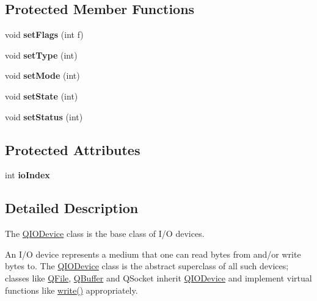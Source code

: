 \subsection*{Protected Member Functions}
\begin{DoxyCompactItemize}
\item 
\mbox{\label{class_q_i_o_device_a9ce695e889efa9145e47195fcc765bf5}} 
void {\bfseries set\+Flags} (int f)
\item 
\mbox{\label{class_q_i_o_device_a16f5a19e0d5dde3ba5e9672974d44b1a}} 
void {\bfseries set\+Type} (int)
\item 
\mbox{\label{class_q_i_o_device_a9a8d9bf655a71b5821699a97a78be6be}} 
void {\bfseries set\+Mode} (int)
\item 
\mbox{\label{class_q_i_o_device_ab8a455c1e81b3382c5db9a65ea70e615}} 
void {\bfseries set\+State} (int)
\item 
\mbox{\label{class_q_i_o_device_a742d895b19b6809d67aa1643baf67639}} 
void {\bfseries set\+Status} (int)
\end{DoxyCompactItemize}
\subsection*{Protected Attributes}
\begin{DoxyCompactItemize}
\item 
\mbox{\label{class_q_i_o_device_a577b65ea2ba37a2243de14143fa0878b}} 
int {\bfseries io\+Index}
\end{DoxyCompactItemize}


\subsection{Detailed Description}
The \mbox{\hyperlink{class_q_i_o_device}{Q\+I\+O\+Device}} class is the base class of I/O devices. 

An I/O device represents a medium that one can read bytes from and/or write bytes to. The \mbox{\hyperlink{class_q_i_o_device}{Q\+I\+O\+Device}} class is the abstract superclass of all such devices; classes like \mbox{\hyperlink{class_q_file}{Q\+File}}, \mbox{\hyperlink{class_q_buffer}{Q\+Buffer}} and Q\+Socket inherit \mbox{\hyperlink{class_q_i_o_device}{Q\+I\+O\+Device}} and implement virtual functions like \mbox{\hyperlink{structcmd_8h_af2a3ea719b83f672637febdd87c36c36}{write()}} appropriately.

